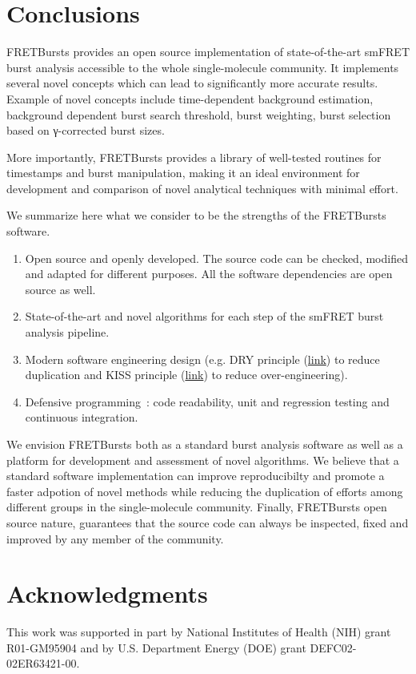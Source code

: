 \section{Conclusions}
\label{sec:conclusions}

FRETBursts provides an open source implementation of state-of-the-art smFRET burst analysis 
accessible to the whole single-molecule community.
It implements several novel concepts which can lead 
to significantly more accurate results. Example of novel concepts include
time-dependent background estimation, background dependent burst search threshold,
burst weighting, burst selection based on γ-corrected burst sizes.

More importantly, FRETBursts provides a library of well-tested routines
for timestamps and burst manipulation, making it an ideal environment for 
development and comparison of novel analytical techniques with minimal effort.

We summarize here what we consider to be the strengths
of the FRETBursts software.

\begin{enumerate}
\item Open source and openly developed. The source code can be checked, modified and
adapted for different purposes. All the software dependencies are open source as well.
\item State-of-the-art and novel algorithms for each step of the
smFRET burst analysis pipeline.
\item Modern software engineering design (e.g. DRY principle
(\href{http://en.wikipedia.org/wiki/Don\%27t_repeat_yourself}{link})
to reduce duplication and KISS principle
(\href{http://en.wikipedia.org/wiki/KISS_principle}{link})
to reduce over-engineering).
\item Defensive programming~\cite{Prli__2012}: code readability,
unit and regression testing and continuous integration.
\end{enumerate}

We envision FRETBursts both as a standard burst analysis 
software as well as a platform for development and assessment of novel algorithms.
We believe that a standard software implementation can improve 
reproducibilty and promote a faster adpotion of novel methods 
while reducing the duplication of efforts among different groups 
in the single-molecule community.
Finally, FRETBursts open source nature, guarantees that the source code 
can always be inspected, fixed and improved 
by any member of the community.


\section*{Acknowledgments}
This work was supported in part by National Institutes of Health (NIH)
grant R01-GM95904 and by U.S. Department Energy (DOE) grant DEFC02-02ER63421-00.
